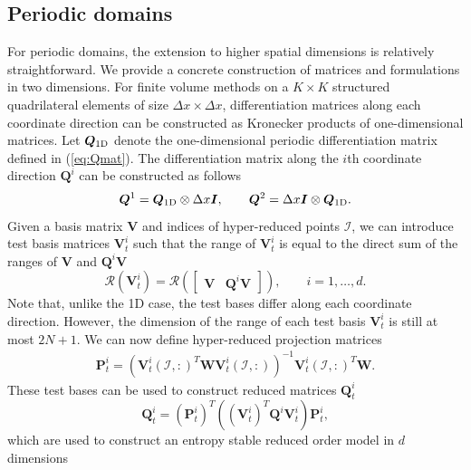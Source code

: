 \documentclass[review]{siamart171218}
\theoremstyle{assumption}
\newcommand{\LRp}[1]{\left( #1 \right)}
\begin{document}
\subsection{Periodic domains}
For periodic domains, the extension to higher spatial dimensions is relatively straightforward.  We provide a concrete construction of matrices and formulations in two dimensions.  For finite volume methods on a $K \times K$ structured quadrilateral elements of size $\Delta x \times \Delta x$, differentiation matrices along each coordinate direction can be constructed as Kronecker products of one-dimensional matrices.  Let $\bm{Q}_{\rm 1D}$ denote the one-dimensional periodic differentiation matrix defined in (\ref{eq:Qmat}).  The differentiation matrix along the $i$th coordinate direction $\bm{Q}^i$ can be constructed as follows
\[
\bm{Q}^1 = \bm{Q}_{\rm 1D}\otimes \Delta x \bm{I}, \qquad \bm{Q}^2 = \Delta x\bm{I} \otimes \bm{Q}_{\rm 1D}.
\]
Given a basis matrix $\bm{V}$ and indices of hyper-reduced points $\mathcal{I}$, we can introduce test basis matrices $\bm{V}^i_t$ such that the range of  $\bm{V}^i_t$ is equal to the direct sum of the ranges of $\bm{V}$ and $\bm{Q}^i\bm{V}$
\[
\mathcal{R}\LRp{\bm{V}^i_t} = \mathcal{R}\LRp{\begin{bmatrix}\bm{V} &\bm{Q}^i\bm{V}\end{bmatrix}}, \qquad i = 1,\ldots,d.
\]
Note that, unlike the 1D case, the test bases differ along each coordinate direction.  However, the dimension of the range of each test basis $\bm{V}_t^i$ is still at most $2N+1$.  
We can now define hyper-reduced projection matrices
\begin{align*}
\bm{P}^i_t = \LRp{\bm{V}^i_t\LRp{\mathcal{I},:}^T\bm{W}\bm{V}^i_t\LRp{\mathcal{I},:}}^{-1}\bm{V}^i_t\LRp{\mathcal{I},:}^T\bm{W}.%
\end{align*}
These test bases can be used to construct reduced matrices $\bm{Q}_t^i$ %
\[
\bm{Q}_t^i = \LRp{\bm{P}^i_t}^T\LRp{\LRp{\bm{V}^i_t}^T\bm{Q}^i\bm{V}^i_t}\bm{P}^i_t,
\]
which are used to construct an entropy stable reduced order model in $d$ dimensions
\end{document}
